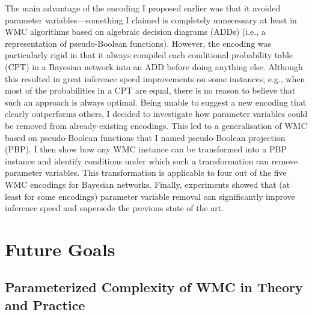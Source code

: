 \documentclass{article}
\begin{document}
\begin{description}
  The main advantage of the encoding I proposed earlier was that it avoided
  parameter variables---something I claimed is completely unnecessary at
  least in WMC algorithms based on algebraic decision diagrams (ADDs) (i.e., a
  representation of pseudo-Boolean functions). However, the encoding was
  particularly rigid in that it always compiled each conditional probability
  table (CPT) in a Bayesian network into an ADD before doing anything else.
  Although this resulted in great inference speed improvements on some
  instances, e.g., when most of the probabilities in a CPT are equal, there is
  no reason to believe that such an approach is always optimal. Being unable to
  suggest a new encoding that clearly outperforms others, I decided to
  investigate how parameter variables could be removed from already-existing
  encodings. This led to a generalisation of WMC based on pseudo-Boolean
  functions that I named pseudo-Boolean projection (PBP). I then show how any
  WMC instance can be transformed into a PBP instance and identify conditions
  under which such a transformation can remove parameter variables. This
  transformation is applicable to four out of the five WMC encodings for
  Bayesian networks. Finally, experiments showed that (at least for some
  encodings) parameter variable removal can significantly improve inference
  speed and supersede the previous state of the art.
\end{description}

\section{Future Goals} \label{sec:future}


\subsection{Parameterized Complexity of WMC in Theory and
  Practice} \label{sec:1}
\end{document}
